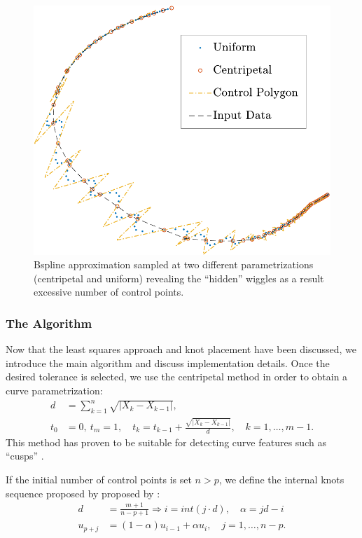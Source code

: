 
 \begin{figure}
  
  \includegraphics{wiggle_ALL-crop}
  \caption{\label{fig:bspline_wiggle}Bspline approximation sampled at two different parametrizations (centripetal and uniform) revealing the ``hidden'' wiggles as a result excessive number 
  of control points.}
 \end{figure}


\subsubsection{The Algorithm}
Now that the least squares approach and knot placement have been discussed, we introduce the main algorithm and discuss implementation 
details. Once the desired tolerance is selected, we use the centripetal method in order to obtain a curve parametrization: 
\begin{align}
 d &= \sum_{k=1}^n \sqrt {| X_k-X_{k-1}|},\\
 t_0 &=0,\ t_m=1,\quad t_k = t_{k-1} + \frac{\sqrt{|X_k-X_{k-1}|}}{d},\quad k = 1,\ldots, m-1.
 \end{align}
This method has proven to be suitable for detecting curve features such as ``cusps'' \cite{}. 
\begin{note}
 If the initial number of control points is set $n > p$, we define the internal knots sequence proposed by proposed by \cite{}: 
  \begin{align}
  d &= \frac{m+1}{n-p+1} \Rightarrow i = int(j\cdot d),\quad \alpha = jd -i\\
  u_{p+j} &= (1-\alpha)u_{i-1} + \alpha u_i,\quad j = 1,\ldots,n-p.
 \end{align}
\end{note}

